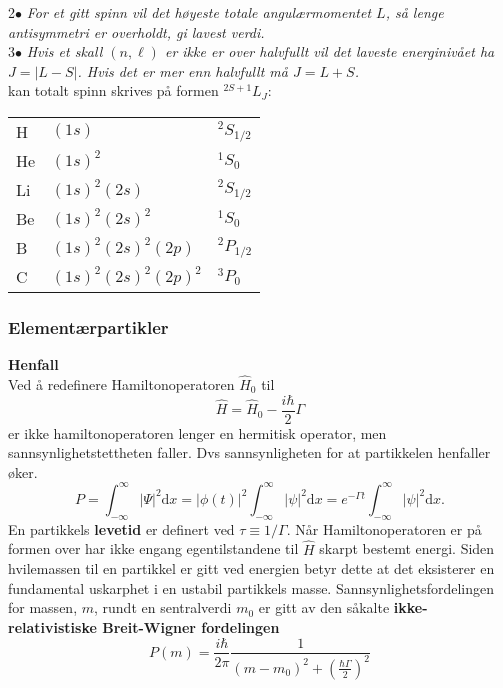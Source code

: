 \documentclass[a4paper, norsk, 8pt]{article}
\begin{document}
\begin{multicols*}{3}
2$\bullet$ \textit{ For et gitt spinn vil det høyeste totale angulærmomentet $L$, så lenge antisymmetri er overholdt, gi lavest verdi.}\\
3$\bullet$ \textit{ Hvis et skall $(n,\ell)$ er ikke er over halvfullt vil det laveste energinivået ha $J=|L-S|$. Hvis det er mer enn halvfullt må $J=L+S$.}\\
kan totalt spinn skrives på formen $^{2S+1}L_J$:\\
\begin{tabular}{| l l l |}
\hline
H 	& $(1s)$ 				& $^2S_{1/2}$ 		\\ 
He 	& $(1s)^2$				& $^1S_{0}$			\\ 
Li 	& $(1s)^2(2s)$			& $^2S_{1/2}$		\\ 
Be	& $(1s)^2(2s)^2$ 		& $^1S_{0}$			\\ 
B 	& $(1s)^2(2s)^2(2p)$	& $^2P_{1/2}$		\\ 
C 	& $(1s)^2(2s)^2(2p)^2$	& $^3P_{0}$ 		\\ \hline
\end{tabular}

\subsubsection*{\scriptsize Elementærpartikler}
\textbf{Henfall} \\
Ved å redefinere Hamiltonoperatoren $\hat{H}_0$ til 
\[ \hat{H}=\hat{H}_0-\frac{i\hbar}{2}\Gamma \]
er ikke hamiltonoperatoren lenger en hermitisk operator, men sannsynlighetstettheten faller. Dvs sannsynligheten for at partikkelen henfaller øker. 
\[P=\int_{-\infty}^{\infty}|\Psi|^2\mbox{d}x=|\phi(t)|^2\int_{-\infty}^{\infty}|\psi|^2\mbox{d}x=e^{-\Gamma t}\int_{-\infty}^{\infty}|\psi|^2\mbox{d}x. \]
En partikkels \textbf{levetid} er definert ved $\tau \equiv 1/\Gamma$. Når Hamiltonoperatoren er på formen over har ikke engang egentilstandene til $\hat{H}$ skarpt bestemt energi. Siden hvilemassen til en partikkel er gitt ved energien betyr dette at det eksisterer en fundamental uskarphet i en ustabil partikkels masse. Sannsynlighetsfordelingen for massen, $m$, rundt en sentralverdi $m_0$ er gitt av den såkalte \textbf{ikke-relativistiske Breit-Wigner fordelingen}
\[ P(m)=\frac{i\hbar}{2\pi}\frac{1}{(m-m_0)^2+\left(\frac{\hbar \Gamma}{2}\right)^2} \]
\end{multicols*}
\end{document}
